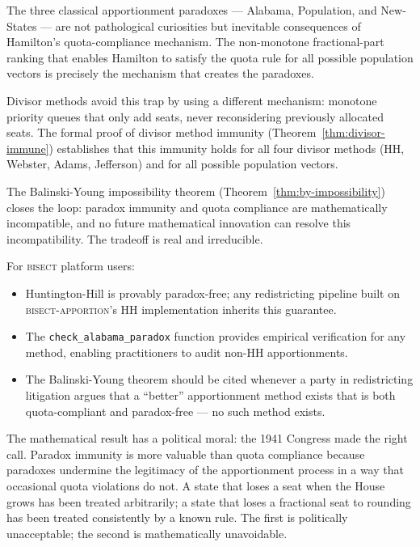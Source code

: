 The three classical apportionment paradoxes --- Alabama, Population,
and New-States --- are not pathological curiosities but inevitable
consequences of Hamilton's quota-compliance mechanism.
The non-monotone fractional-part ranking that enables Hamilton to
satisfy the quota rule for all possible population vectors is
precisely the mechanism that creates the paradoxes.

Divisor methods avoid this trap by using a different mechanism:
monotone priority queues that only add seats, never reconsidering
previously allocated seats.
The formal proof of divisor method immunity
(Theorem~\ref{thm:divisor-immune}) establishes that this immunity
holds for all four divisor methods (HH, Webster, Adams, Jefferson)
and for all possible population vectors.

The Balinski-Young impossibility theorem
(Theorem~\ref{thm:by-impossibility}) closes the loop:
paradox immunity and quota compliance are mathematically incompatible,
and no future mathematical innovation can resolve this incompatibility.
The tradeoff is real and irreducible.

For \textsc{bisect} platform users:
\begin{itemize}
  \item Huntington-Hill is provably paradox-free; any redistricting
    pipeline built on \textsc{bisect-apportion}'s HH implementation
    inherits this guarantee.
  \item The \texttt{check\_alabama\_paradox} function provides
    empirical verification for any method, enabling practitioners
    to audit non-HH apportionments.
  \item The Balinski-Young theorem should be cited whenever a party
    in redistricting litigation argues that a ``better'' apportionment
    method exists that is both quota-compliant and paradox-free ---
    no such method exists.
\end{itemize}

The mathematical result has a political moral: the 1941 Congress
made the right call.
Paradox immunity is more valuable than quota compliance because
paradoxes undermine the legitimacy of the apportionment process
in a way that occasional quota violations do not.
A state that loses a seat when the House grows has been treated
arbitrarily; a state that loses a fractional seat to rounding
has been treated consistently by a known rule.
The first is politically unacceptable; the second is mathematically
unavoidable.
